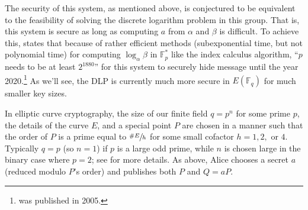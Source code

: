 The security of this system, as mentioned above, is conjectured to be
    equivalent to the feasibility of solving the discrete logarithm problem in
    this group.
That is, this system is secure as long as computing $a$ from $\alpha$ and
    $\beta$ is difficult.
To achieve this, \cite{stinson2005cryptography} states that because of rather
    efficient methods (subexponential time, but not polynomial time) for
    computing $\log_\alpha \beta$ in $\mathbb{F}_p^\ast$ like the index
    calculus algorithm, ``$p$ needs to be at least $2^{1880}$'' for this system
    to securely hide message until the year 2020.\footnote{
        \cite{stinson2005cryptography} was published in 2005.}
As we'll see, the DLP is currently much more secure in $E(\mathbb{F}_q)$ for
    much smaller key sizes.

In elliptic curve cryptography, the size of our finite field $q = p^n$ for some
    prime $p$, the details of the curve $E$, and a special point $P$ are chosen
    in a manner such that the order of $P$ is a prime equal to $\sfrac{\#E}{h}$
    for some small cofactor $h = 1, 2,$ or $4$.
Typically $q = p$ (so $n = 1$) if $p$ is a large odd prime, while $n$ is chosen
    large in the binary case where $p = 2$; see \cite{gallagher09fipspub} for
    more details.
As above, Alice chooses a secret $a$ (reduced modulo $P$'s order) and publishes
    both $P$ and $Q = aP$.

